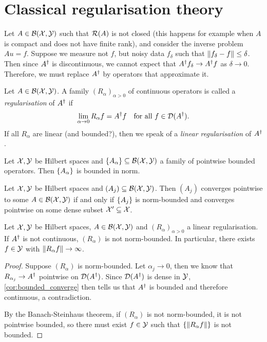 \section{Classical regularisation theory}
Let $A \in \mathcal B(\mathcal X, \mathcal Y)$ such that $\operatorname{\mathcal R}(A)$ is not closed (this happens for example when $A$ is compact and does not have finite rank), and consider the inverse problem $Au = f$. Suppose we measure not $f$, but noisy data $f_\delta$ such that $\norm{f_\delta - f} \leq \delta$. Then since $A^\dagger$ is discontinuous, we cannot expect that $A^\dagger f_\delta \to A^\dagger f$ as $\delta \to 0$. Therefore, we must replace $A^\dagger$ by operators that approximate it.

\begin{definition}
	Let $A\in \mathcal B(\mathcal X, \mathcal Y)$. A family $(R_\alpha)_{\alpha > 0}$ of continuous operators is called a \emph{regularisation} of $A^\dagger$ if
	\[
	\lim_{\alpha \to 0} R_\alpha f = A^\dagger f \quad\text{for all $f \in \operatorname{\mathcal D}(A^\dagger)$}. 
	\]
	If all $R_\alpha$ are linear (\TODO and bounded?), then we speak of a \emph{linear regularisation} of $A^\dagger$. 
\end{definition}

\begin{theorem}
	Let $\mathcal X, \mathcal Y$ be Hilbert spaces and $\qty{A_\alpha} \subseteq \mathcal B(\mathcal X, \mathcal Y)$ a family of pointwise bounded operators. Then $\qty{A_\alpha}$ is bounded in norm. 
\end{theorem}

\begin{corollary} \label{cor:bounded_converge}
	Let $\mathcal X, \mathcal Y$ be Hilbert spaces and $(A_j) \subseteq \mathcal B(\mathcal X, \mathcal Y)$. Then $(A_j)$ converges pointwise to some $A \in \mathcal B(\mathcal X, \mathcal Y)$ if and only if $\qty{A_j}$ is norm-bounded and converges pointwise on some dense subset $\mathcal X' \subseteq \mathcal X$. 
\end{corollary}

\begin{theorem}
	Let $\mathcal X, \mathcal Y$ be Hilbert spaces, $A \in \mathcal B(\mathcal X, \mathcal Y)$ and $(R_\alpha)_{\alpha > 0}$ a linear regularisation. If $A^\dagger$ is not continuous, $(R_\alpha)$ is not norm-bounded. In particular, there exists $f \in \mathcal Y$ with $\norm{R_\alpha f} \to \infty$. 
\end{theorem}

\begin{proof}
	Suppose $(R_\alpha)$ is norm-bounded. Let $\alpha_j \to 0$, then we know that $R_{\alpha_j} \to A^\dagger$ pointwise on $\operatorname{\mathcal D}(A^\dagger)$. Since $\operatorname{\mathcal D}(A^\dagger)$ is dense in $\mathcal Y$, \cref{cor:bounded_converge} then  tells us that $A^\dagger$ is bounded and therefore continuous, a contradiction. 
	
	By the Banach-Steinhaus theorem, if $(R_\alpha)$ is not norm-bounded, it is not pointwise bounded, so there must exist $f \in \mathcal Y$ such that $\qty{\norm{R_\alpha f}}$ is not bounded. 
\end{proof}

